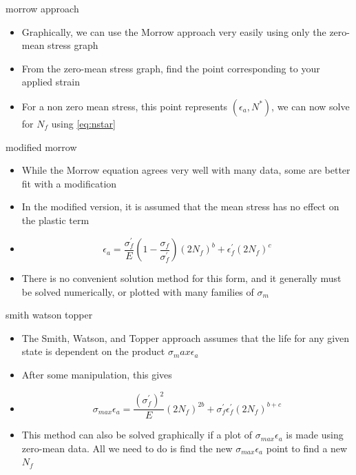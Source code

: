 \documentclass[10pt]{beamer}
\begin{document}
\begin{frame}{morrow approach}
	\begin{itemize}[<+->]
		\item Graphically, we can use the Morrow approach very easily using only the zero-mean stress graph
		\item From the zero-mean stress graph, find the point corresponding to your applied strain
		\item For a non zero mean stress, this point represents $(\epsilon_a, N^*)$, we can now solve for $N_f$ using \ref{eq:nstar}
	\end{itemize}
\end{frame}

\begin{frame}{modified morrow}
	\begin{itemize}[<+->]
		\item While the Morrow equation agrees very well with many data, some are better fit with a modification
		\item In the modified version, it is assumed that the mean stress has no effect on the plastic term
		\item[] \begin{equation}
		\epsilon_a = \frac{\sigma_f^\prime}{E}\left(1-\frac{\sigma_f}{\sigma_f^\prime}\right)(2N_f)^b + \epsilon_f^\prime (2N_f)^c
		\end{equation}
		\item There is no convenient solution method for this form, and it generally must be solved numerically, or plotted with many families of $\sigma_m$
	\end{itemize}
\end{frame}

\begin{frame}{smith watson topper}
	\begin{itemize}[<+->]
		\item The Smith, Watson, and Topper approach assumes that the life for any given state is dependent on the product $\sigma_max \epsilon_a$
		\item After some manipulation, this gives
		\item[] \begin{equation}
		\sigma_{max} \epsilon_a = \frac{\left(\sigma_f^\prime\right)^2}{E}(2N_f)^{2b} + \sigma_f^\prime \epsilon_f^\prime (2N_f)^{b+c}
		\end{equation}
		\item This method can also be solved graphically if a plot of $\sigma_{max} \epsilon_a$ is made using zero-mean data. All we need to do is find the new $\sigma_{max} \epsilon_a$ point to find a new $N_f$
	\end{itemize}
\end{frame}
\end{document}
